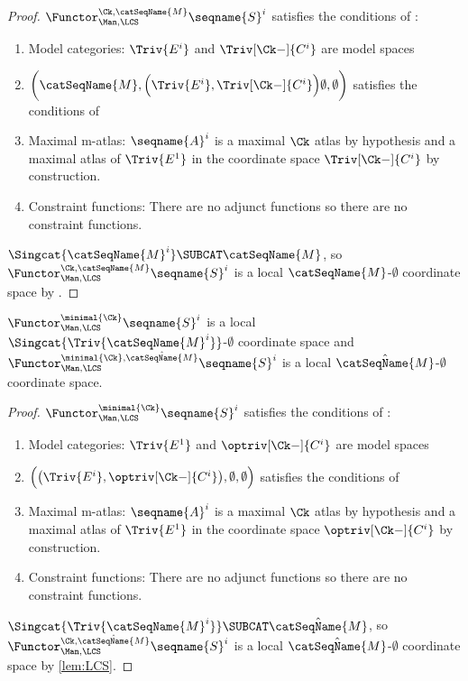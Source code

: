\documentclass{article}
\begin{document}
\begin{theorem}
\begin{proof}
$\Functor^{\Ck,\catSeqName{M}}_{\Man,\LCS} \seqname{S}^i$
satisfies the conditions of :
\begin{enumerate}
\item Model categories:
$\Triv{E^i}$ and $\Triv[\Ck-]{C^i}$ are model spaces
\item
$
\biggl (
  \catSeqName{M},
  \Bigl ( \Triv{E^i}, \Triv[\Ck-]{C^i} \Bigr )
  \emptyset,
  \emptyset
\biggr )
$
satisfies the conditions of 
\item Maximal m-atlas:
$\seqname{A}^i$ is a maximal $\Ck$ atlas by hypothesis and a
maximal atlas of $\Triv{E^1}$ in the coordinate space $\Triv[\Ck-]{C^i}$
by construction.
\item Constraint functions:
There are no adjunct functions so there are no constraint functions.
\end{enumerate}

$\Singcat{\catSeqName{M}^i} \SUBCAT \catSeqName{M}$, so
$\Functor^{\Ck,\catSeqName{M}}_{\Man,\LCS} \seqname{S}^i$ is a local
$\catSeqName{M}$-$\emptyset$ coordinate space by
.
\end{proof}

$\Functor^{\minimal{\Ck}}_{\Man,\LCS} \seqname{S}^i$ is a local
$\Singcat{\Triv{\catSeqName{M}^i}}$-$\emptyset$ coordinate space and
$
  \Functor^{\minimal{\Ck},\hat{\catSeqName{M}}}_{\Man,\LCS}
    \seqname{S}^i
$
is a local $\hat{\catSeqName{M}}$-$\emptyset$ coordinate space.

\begin{proof}
$\Functor^{\minimal{\Ck}}_{\Man,\LCS} \seqname{S}^i$
satisfies the conditions of :
\begin{enumerate}
\item Model categories:
$\Triv{E^1}$ and $\optriv[\Ck-]{C^i}$ are model spaces
\item
$
  \Bigl (
    \bigl ( \Triv{E^i}, \optriv[\Ck-]{C^i} \bigr ), \emptyset, \emptyset
  \Bigr )
$
satisfies the conditions of 
\item Maximal m-atlas:
$\seqname{A}^i$ is a maximal $\Ck$ atlas by hypothesis and a
maximal atlas of $\Triv{E^1}$ in the coordinate space
$\optriv[\Ck-]{C^i}$ by construction.
\item Constraint functions:
There are no adjunct functions so there are no constraint functions.
\end{enumerate}

$\Singcat{\Triv{\catSeqName{M}^i}} \SUBCAT \hat{\catSeqName{M}}$, so
$\Functor^{\Ck,\hat{\catSeqName{M}}}_{\Man,\LCS} \seqname{S}^i$ is a local
$\hat{\catSeqName{M}}$-$\emptyset$ coordinate space by \cref{lem:LCS}.
\end{proof}


\end{theorem}
\end{document}

